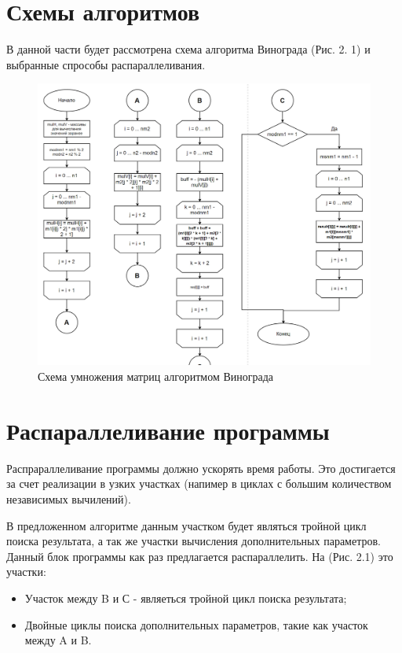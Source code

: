 \documentclass[12pt]{report}
\begin{document}
\section{Схемы алгоритмов}
В данной части будет рассмотрена схема алгоритма Винограда (Рис. 2. 1) и выбранные спрособы распараллеливания.

\begin{figure}[hp]
	\centering
	\includegraphics[width=1.2\linewidth]{VV.jpg}
	\caption{Схема умножения матриц алгоритмом Винограда}
	\label{fig:mpr}
\end{figure}

\newpage

\section{Распараллеливание программы}
Распрараллеливание программы должно ускорять время работы. Это достигается за счет реализации в узких участках (напимер в циклах с большим количеством независимых вычилений).

В предложенном алгоритме данным участком будет являться тройной цикл поиска результата, а так же участки вычисления дополнительных параметров.
Данный блок программы как раз предлагается распараллелить.
На (Рис. 2.1) это участки:
\begin{itemize}
	\item Участок между B и С - являеться тройной цикл поиска результата; 
	\item Двойные циклы поиска дополнительных параметров, такие как участок между A и B.
\end{itemize}
\end{document}
